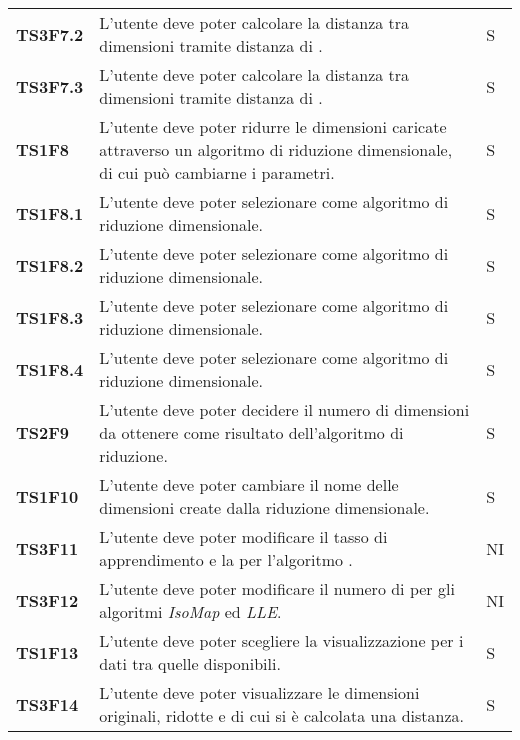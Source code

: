 {\begin{longtable}{ C{2cm} | C{12cm}| C{1.5cm} }
\textbf{TS3F7.2} & 
L'utente deve poter calcolare la distanza tra dimensioni tramite distanza di . & 
S\\

\textbf{TS3F7.3} & 
L'utente deve poter calcolare la distanza tra dimensioni tramite distanza di . & 
S\\

\textbf{TS1F8} & 
L'utente deve poter ridurre le dimensioni caricate attraverso un algoritmo di riduzione dimensionale, di cui può cambiarne i parametri. & 
S\\

\textbf{TS1F8.1} & 
L'utente deve poter selezionare  come algoritmo di riduzione dimensionale. & 
S\\

\textbf{TS1F8.2} & 
L'utente deve poter selezionare  come algoritmo di riduzione dimensionale. & 
S\\

\textbf{TS1F8.3} & 
L'utente deve poter selezionare  come algoritmo di riduzione dimensionale. & 
S\\

\textbf{TS1F8.4} & 
L'utente deve poter selezionare  come algoritmo di riduzione dimensionale. & 
S\\

\textbf{TS2F9} & 
L'utente deve poter decidere il numero di dimensioni da ottenere come risultato dell'algoritmo di riduzione. & 
S\\

\textbf{TS1F10} & 
L'utente deve poter cambiare il nome delle dimensioni create dalla riduzione dimensionale. & 
S\\

\textbf{TS3F11} & 
L'utente deve poter modificare il tasso di apprendimento e la  per l'algoritmo . & 
NI\\

\textbf{TS3F12} & 
L'utente deve poter modificare il numero di  per gli algoritmi \textit{IsoMap} ed \textit{LLE}. & 
NI\\

\textbf{TS1F13} & 
L'utente deve poter scegliere la visualizzazione per i dati tra quelle disponibili. & 
S\\

\textbf{TS3F14} & 
L'utente deve poter visualizzare le dimensioni originali, ridotte e di cui si è calcolata una distanza. & 
S\\


\end{longtable}}
